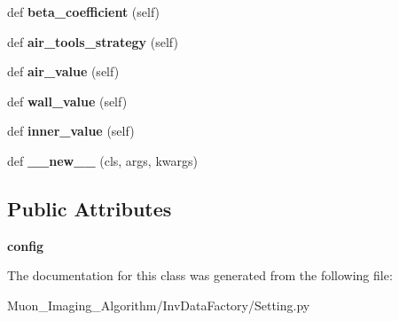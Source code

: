 \begin{DoxyCompactItemize}
def {\bfseries beta\+\_\+coefficient} (self)
\item 
\mbox{\label{classMIS_1_1Muon__Imaging__Algorithm_1_1InvDataFactory_1_1Setting_1_1Setting_1_1__Sys__setting_a1f77c283919a5a4ecd4ec550a7e8e008}} 
def {\bfseries air\+\_\+tools\+\_\+strategy} (self)
\item 
\mbox{\label{classMIS_1_1Muon__Imaging__Algorithm_1_1InvDataFactory_1_1Setting_1_1Setting_1_1__Sys__setting_ad052e39a5671bd5049d357e297f65ccf}} 
def {\bfseries air\+\_\+value} (self)
\item 
\mbox{\label{classMIS_1_1Muon__Imaging__Algorithm_1_1InvDataFactory_1_1Setting_1_1Setting_1_1__Sys__setting_a9ce36e021b54376a65c5a465cb8d115e}} 
def {\bfseries wall\+\_\+value} (self)
\item 
\mbox{\label{classMIS_1_1Muon__Imaging__Algorithm_1_1InvDataFactory_1_1Setting_1_1Setting_1_1__Sys__setting_a7efab159b14cafb3635b1437eda655f9}} 
def {\bfseries inner\+\_\+value} (self)
\item 
\mbox{\label{classMIS_1_1Muon__Imaging__Algorithm_1_1InvDataFactory_1_1Setting_1_1Setting_1_1__Sys__setting_a73c06e88cbfaeec5e09a49c7f674b2ca}} 
def {\bfseries \+\_\+\+\_\+new\+\_\+\+\_\+} (cls, args, kwargs)
\end{DoxyCompactItemize}
\subsection*{Public Attributes}
\begin{DoxyCompactItemize}
\item 
\mbox{\label{classMIS_1_1Muon__Imaging__Algorithm_1_1InvDataFactory_1_1Setting_1_1Setting_1_1__Sys__setting_aa51e79d18d3cb87265ff721321630e5b}} 
{\bfseries config}
\end{DoxyCompactItemize}


The documentation for this class was generated from the following file\+:\begin{DoxyCompactItemize}
\item 
Muon\+\_\+\+Imaging\+\_\+\+Algorithm/\+Inv\+Data\+Factory/Setting.\+py\end{DoxyCompactItemize}

